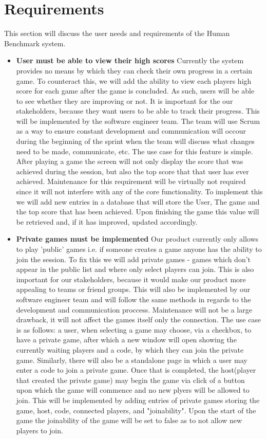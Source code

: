 \documentclass[]{VUMIFTemplateClass}
\begin{document}
\section{Requirements}
\label{sec:requirements}
This section will discuss the user needs and requirements of the Human Benchmark system.
\begin{itemize}
 \item \textbf{User must be able to view their high scores}  Currently the system provides no means by which they can check their own progress in a certain game. To counteract this, we will add the ability to view each players high score for each game after the game is concluded. As such, users will be able to see whether they are improving or not. It is important for the our stakeholders, because they want users to be able to track their progress. This will be implemented by the software engineer team. The team will use Scrum as a way to ensure constant development and communication will occour during the beginning of the sprint when the team will discuss what changes need to be made, communicate, etc. The use case for this feature is simple. After playing a game the screen will not only display the score that was achieved during the session, but also the top score that that user has ever achieved. Maintenance for this requirement will be virtually not required since it will not interfere with any of the core functionality. To implement this we will add new entries in a database that will store the User, The game and the top score that has been achieved. Upon finishing the game this value will be retrieved and, if it has improved, updated accordingly.

 \item \textbf{Private games must be implemented}   Our product currently only allows to play 'public' games i.e. if someone creates a game anyone has the ability to join the session. To fix this we will add private games - games which don't appear in the public list and where only select players can join. This is also important for our stakeholders, because it would make our product more appealing to teams or friend groups. This will also be implemented by our software engineer team and will follow the same methods in regards to the development and communication proccess. Maintenance will not be a large drawback, it will not affect the games itself only the connection. The use case is as follows: a user, when selecting a game may choose, via a checkbox, to have a private game, after which a new window will open showing the currently waiting players and a code, by which they can join the private game. Similarly, there will also be a standalone page in which a user may enter a code to join a private game. Once that is completed, the host(player that created the private game) may begin the game via click of a button upon which the game will commence and no new plyers will be allowed to join. This will be implemented by adding entries of private games storing the game, host, code, connected players, and "joinability". Upon the start of the game the joinability of the game will be set to false as to not allow new players to join.


\end{itemize}
\end{document}
